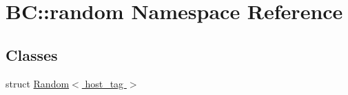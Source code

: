 \hypertarget{namespaceBC_1_1random}{}\section{BC\+:\+:random Namespace Reference}
\label{namespaceBC_1_1random}
\subsection*{Classes}
\begin{DoxyCompactItemize}
\item 
struct \hyperlink{structBC_1_1random_1_1Random_3_01host__tag_01_4}{Random$<$ host\+\_\+tag $>$}
\end{DoxyCompactItemize}
